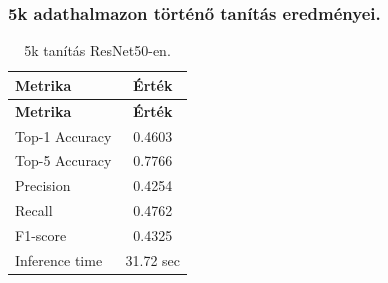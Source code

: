 \subsubsection{5k adathalmazon történő tanítás eredményei.}
  \begin{center}
    \begin{longtable}{l c}
    \caption{5k tanítás ResNet50-en.} \label{tab:phase03_ResNet50_5k} \\
    \toprule
    \textbf{Metrika} & \textbf{Érték} \\
    \midrule
    \endfirsthead
    \toprule
    \textbf{Metrika} & \textbf{Érték} \\
    \midrule
    \endhead
    Top-1 Accuracy & 0.4603 \\
    Top-5 Accuracy & 0.7766 \\
    Precision      & 0.4254 \\
    Recall         & 0.4762 \\
    F1-score       & 0.4325 \\
    Inference time & 31.72 sec \\
    \bottomrule
    \end{longtable}
  \end{center}

